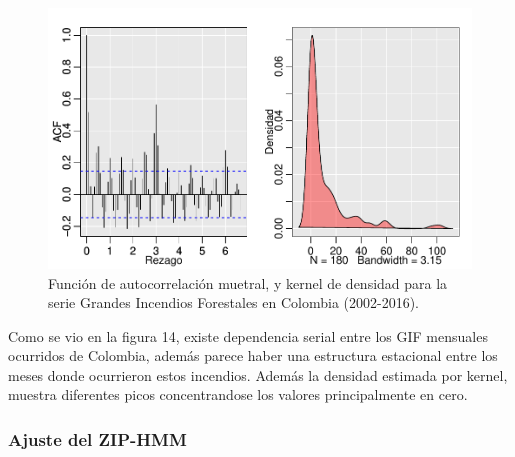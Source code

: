 \documentclass[a4paper]{article}\usepackage[]{graphicx}\usepackage[]{color}
\makeatletter
\def\maxwidth{ %
  \ifdim\Gin@nat@width>\linewidth
    \linewidth
  \else
    \Gin@nat@width
  \fi
}
\newenvironment{knitrout}{}{} %
\makeatother
\begin{document}
\begin{knitrout}
\color{fgcolor}\begin{figure}
\includegraphics[width=\maxwidth]{figure/unnamed-chunk-38-1} \caption[Función de autocorrelación muetral, y kernel de densidad para la serie Grandes Incendios Forestales en Colombia (2002-2016)]{Función de autocorrelación muetral, y kernel de densidad para la serie Grandes Incendios Forestales en Colombia (2002-2016).}\label{fig:unnamed-chunk-38}
\end{figure}


\end{knitrout}

Como se vio en la figura 14, existe dependencia serial entre los GIF mensuales ocurridos de Colombia, además parece haber una estructura estacional entre los meses donde ocurrieron estos incendios. Además la densidad estimada por kernel, muestra diferentes picos concentrandose los valores principalmente en cero.

\subsubsection{Ajuste del ZIP-HMM}
\end{document}
